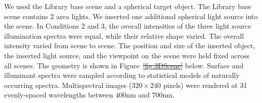 \documentclass{jov}
\providecommand{\DIFaddtex}[1]{{\protect\color{blue}\uwave{#1}}} %
\providecommand{\DIFdeltex}[1]{{\protect\color{red}\sout{#1}}}                      %
\providecommand{\DIFaddbegin}{} %
\providecommand{\DIFaddend}{} %
\providecommand{\DIFdelbegin}{} %
\providecommand{\DIFdelend}{} %
\providecommand{\DIFadd}[1]{\texorpdfstring{\DIFaddtex{#1}}{#1}} %
\providecommand{\DIFdel}[1]{\texorpdfstring{\DIFdeltex{#1}}{}} %
\newcommand{\DIFscaledelfig}{0.5}
\newlength{\DIFdelgraphicswidth} %
\newlength{\DIFdelgraphicsheight} %
\newcommand{\DIFaddincludegraphics}[2][]{{\color{blue}\fbox{\DIFOincludegraphics[#1]{#2}}}} %
\newcommand{\DIFdelincludegraphics}[2][]{%
\sbox{\DIFdelgraphicsbox}{\DIFOincludegraphics[#1]{#2}}%
\settoboxwidth{\DIFdelgraphicswidth}{\DIFdelgraphicsbox} %
\settoboxtotalheight{\DIFdelgraphicsheight}{\DIFdelgraphicsbox} %
\scalebox{\DIFscaledelfig}{%
\parbox[b]{\DIFdelgraphicswidth}{\usebox{\DIFdelgraphicsbox}\\[-\baselineskip] \rule{\DIFdelgraphicswidth}{0em}}\llap{\resizebox{\DIFdelgraphicswidth}{\DIFdelgraphicsheight}{%
\setlength{\unitlength}{\DIFdelgraphicswidth}%
\begin{picture}(1,1)%
\thicklines\linethickness{2pt} %
{\color[rgb]{1,0,0}\put(0,0){\framebox(1,1){}}}%
{\color[rgb]{1,0,0}\put(0,0){\line( 1,1){1}}}%
{\color[rgb]{1,0,0}\put(0,1){\line(1,-1){1}}}%
\end{picture}%
}\hspace*{3pt}}} %
} %
\DeclareRobustCommand{\DIFaddbegin}{\DIFOaddbegin \let\includegraphics\DIFaddincludegraphics} %
\DeclareRobustCommand{\DIFaddend}{\DIFOaddend \let\includegraphics\DIFOincludegraphics} %
\DeclareRobustCommand{\DIFdelbegin}{\DIFOdelbegin \let\includegraphics\DIFdelincludegraphics} %
\DeclareRobustCommand{\DIFdelend}{\DIFOaddend \let\includegraphics\DIFOincludegraphics} %
\begin{document}
We used the Library base scene and a spherical target object.
The Library base scene contains 2 area lights. 
We inserted one additional spherical light source into the scene.
In Conditions 2 and 3, the overall intensities of the three light source illumination spectra were equal, while their relative shape varied. 
The overall intensity varied from scene to scene.
The position and size of the inserted object, the inserted light source, and the viewpoint on the scene were held fixed across all 
scenes. The geometry is shown in Figure~\DIFdelbegin \DIFdel{\ref{fig:3DScene} }\DIFdelend \DIFaddbegin \DIFadd{\ref{fig:figure9}a }\DIFaddend below.
Surface and illuminant spectra were sampled according to statistical models of naturally occurring spectra.
Multispectral images ($320 \times 240$ pixels) were rendered at 31 evenly-spaced wavelengths between $400$nm and $700$nm.
\end{document}
